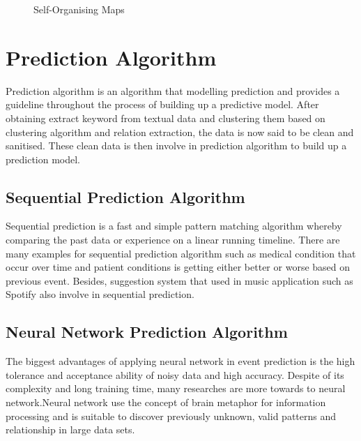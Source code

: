\documentclass[twoside]{utmthesis}
\begin{document}
\begin{enumerate}
\begin{figure}[H]
\centering
{}
\caption{Self-Organising Maps}
\end{figure} 
\vspace{-1cm}
\end{enumerate}




\section{Prediction Algorithm}
Prediction algorithm is an algorithm that modelling prediction and provides a guideline throughout the process of building up a predictive model. After obtaining extract keyword from textual data and clustering them based on clustering algorithm and relation extraction, the data is now said to be clean and sanitised. These clean data is then involve in prediction algorithm to build up a prediction model. 
\subsection{Sequential Prediction Algorithm}
Sequential prediction is a fast and simple pattern matching algorithm whereby comparing the past data or experience on a linear running timeline. There are many examples for sequential prediction algorithm such as medical condition that occur over time and patient conditions is getting either better or worse based on previous event. Besides, suggestion system that used in music application such as Spotify also involve in sequential prediction. 

\subsection{Neural Network Prediction Algorithm}
The biggest advantages of applying neural network in event prediction is the high tolerance and acceptance ability of noisy data and high accuracy. Despite of its complexity and long training time, many researches are more towards to neural network.\citep{granroth2016happens,hu2017happens,asencio2017medium}Neural network use the concept of brain metaphor for information processing and is suitable to discover previously unknown, valid patterns and relationship in large data sets. \citep{gaur2012neural}
\end{document}
